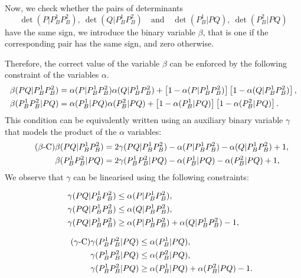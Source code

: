 \documentclass[a4paper,  review, authoryear, 1p.]{elsarticle}
\newcommand{\determinant}[3]{\det({#1|#2#3})}
\begin{document}
	\newcommand{\betamas}[4]{\beta(#1#2|#3#4)}
	
	Now, we check whether the pairs of determinants 
	\begin{equation}\label{eq:pair}
		\determinant{P}{P_B^1}{P_B^2},\: \determinant{Q}{P_B^1}{P_B^2}\quad \text{and} \quad \determinant{P_B^1}{P}{Q},\:	 \determinant{P_B^2}{P}{Q}
	\end{equation} 
	have the same sign, we introduce the binary variable $\beta$, that is one if the corresponding pair has the same sign, and zero otherwise.
	
	\newcommand{\gammaprod}[4]{\gamma(#1#2|#3#4)}
	
	Therefore, the correct value of the variable $\beta$ can be enforced by the following constraint of the variables $\alpha$.
	\begin{align*}%
		\betamas{P}{Q}{P_B^1}{P_B^2}&=\alphamas{P}{P_B^1}{P_B^2}\alphamas{Q}{P_B^1}{P_B^2} + \left[1-\alphamas{P}{P_B^1}{P_B^2}\right]\left[1-\alphamas{Q}{P_B^1}{P_B^2}\right],\\
		\betamas{P_B^1}{P_B^2}{P}{Q}&=\alphamas{P_B^1}{P}{Q}\alphamas{P_B^2}{P}{Q} + \left[1-\alphamas{P_B^1}{P}{Q}\right]\left[1-\alphamas{P_B^2}{P}{Q}\right].
	\end{align*}
	This condition can be equivalently written using an auxiliary binary variable $\gamma$ that models the product of the $\alpha$ variables:
	\begin{align*}\tag{$\beta$-C}\label{eq:betaC}
		\betamas{P}{Q}{P_B^1}{P_B^2}&=2\gammaprod{P}{Q}{P_B^1}{P_B^2} -\alphamas{P}{P_B^1}{P_B^2}-\alphamas{Q}{P_B^1}{P_B^2}+1,\\
		\betamas{P_B^1}{P_B^2}{P}{Q}&=2\gammaprod{P_B^1}{P_B^2}{P}{Q} -\alphamas{P_B^1}{P}{Q}-\alphamas{P_B^2}{P}{Q}+1,
	\end{align*}
	We observe that $\gamma$ can be linearised using the following constraints:
	
	\begin{minipage}{.5\linewidth}
		\begin{align*}
			\gammaprod{P}{Q}{P_B^1}{P_B^2} & \leq \alphamas{P}{P_B^1}{P_B^2},\\
			\gammaprod{P}{Q}{P_B^1}{P_B^2} & \leq \alphamas{Q}{P_B^1}{P_B^2},\\
			\gammaprod{P}{Q}{P_B^1}{P_B^2} & \geq \alphamas{P}{P_B^1}{P_B^2} + \alphamas{Q}{P_B^1}{P_B^2} - 1,
		\end{align*}
	\end{minipage}
	\begin{minipage}{.5\linewidth}
		\begin{align*}\tag{$\gamma$-C}\label{eq:gammaC}
			\gammaprod{P_B^1}{P_B^2}{P}{Q} & \leq \alphamas{P_B^1}{P}{Q},\\
			\gammaprod{P_B^1}{P_B^2}{P}{Q} & \leq \alphamas{P_B^2}{P}{Q},\\
			\gammaprod{P_B^1}{P_B^2}{P}{Q} & \geq \alphamas{P_B^1}{P}{Q} + \alphamas{P_B^2}{P}{Q} - 1.
		\end{align*}
	\end{minipage}
	
\end{document}
